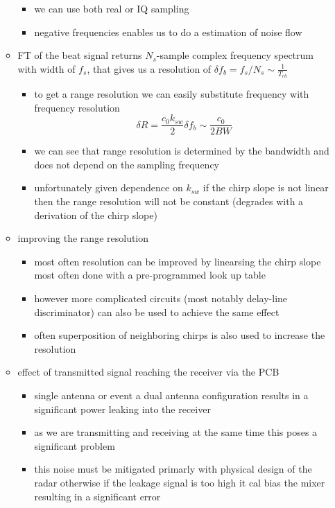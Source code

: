 \documentclass[a4paper,12pt]{report}
\begin{document}
\begin{itemize}
\begin{itemize}
\begin{itemize}
					\item we can use both real or IQ sampling
					\item negative frequencies enables us to do a estimation of noise flow
				\end{itemize}
			\item FT of the beat signal returns $N_s$-sample complex frequency spectrum with width of $f_s$, that gives us a resolution of $\delta f_b = f_s/N_s \sim \frac{1}{T_{ch}}$
				\begin{itemize}
					\item to get a range resolution we can easily substitute frequency with frequency resolution
						\[
							\delta R = \frac{c_0 k_{sw}}{2} \delta f_b \sim \frac{c_0}{2BW}
						\]
					\item we can see that range resolution is determined by the bandwidth and does not depend on the sampling frequency
					\item unfortunately given dependence  on $k_{sw}$ if the chirp slope is not linear then the range resolution will not be constant (degrades with a derivation of the chirp slope)
				\end{itemize}
			\item improving the range resolution
				\begin{itemize}
					\item most often resolution can be improved by linearsing the chirp slope most often done with a pre-programmed look up table
					\item however more complicated circuits (most notably delay-line discriminator) can also be used to achieve the same effect
					\item often superposition of neighboring chirps is also used to increase the resolution
				\end{itemize}
			\item effect of transmitted signal reaching the receiver via the PCB
				\begin{itemize}
					\item single antenna or event a dual antenna configuration results in a significant power leaking into the receiver
					\item as we are transmitting and receiving at the same time this poses a significant problem
					\item this noise must be mitigated primarly with physical design of the radar otherwise if the leakage signal is too high it cal bias the mixer resulting in a significant error

\end{itemize}
\end{itemize}
\end{itemize}
\end{document}
